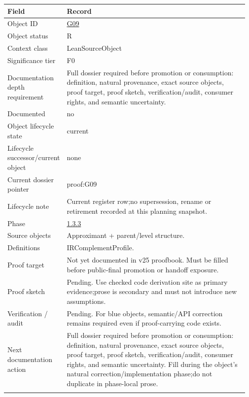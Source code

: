 \begin{longtable}{L{0.16\linewidth} L{0.81\linewidth}}
\hline
\textbf{Field} & \textbf{Record}\\
\hline
Object ID & \hyperlink{object-row-G09}{G09}\\
\hline\addlinespace[0.20em]
Object status & R\\
\hline\addlinespace[0.20em]
Context class & LeanSourceObject\\
\hline\addlinespace[0.20em]
Significance tier & F0\\
\hline\addlinespace[0.20em]
Documentation depth requirement & Full dossier required before promotion or consumption: definition, natural provenance, exact source objects, proof target, proof sketch, verification/\allowbreak{}audit, consumer rights, and semantic uncertainty.\\
\hline\addlinespace[0.20em]
Documented & no\\
\hline\addlinespace[0.20em]
Object lifecycle state & current\\
\hline\addlinespace[0.20em]
Lifecycle successor/\allowbreak{}current object & none\\
\hline\addlinespace[0.20em]
Current dossier pointer & proof:G09\\
\hline\addlinespace[0.20em]
Lifecycle note & Current register row;\newline no supersession, rename or retirement recorded at this planning snapshot.\\
\hline\addlinespace[0.20em]
Phase & \hyperlink{phase-row-1-3-3}{1.3.3}\\
\hline\addlinespace[0.20em]
Source objects & Approximant + parent/\allowbreak{}level structure.\\
\hline\addlinespace[0.20em]
Definitions & IRComplementProfile.\\
\hline\addlinespace[0.20em]
Proof target & Not yet documented in v25 proofbook. Must be filled before public-final promotion or handoff exposure.\\
\hline\addlinespace[0.20em]
Proof sketch & Pending. Use checked code derivation site as primary evidence;\newline prose is secondary and must not introduce new assumptions.\\
\hline\addlinespace[0.20em]
Verification /\allowbreak{} audit & Pending. For blue objects, semantic/\allowbreak{}API correction remains required even if proof-carrying code exists.\\
\hline\addlinespace[0.20em]
Next documentation action & Full dossier required before promotion or consumption: definition, natural provenance, exact source objects, proof target, proof sketch, verification/\allowbreak{}audit, consumer rights, and semantic uncertainty. Fill during the object's natural correction/\allowbreak{}implementation phase;\newline do not duplicate in phase-local prose.\\
\hline\addlinespace[0.20em]
\end{longtable}
